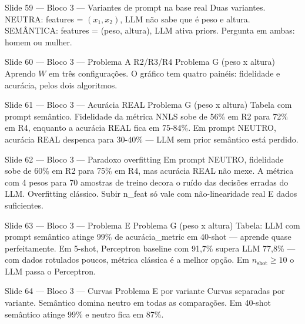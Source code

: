 \documentclass[aspectratio=169,10pt]{beamer}
\begin{document}
\begin{frame}{Slide 59 --- Bloco 3 --- Variantes de prompt na base real}
\footnotesize
Duas variantes. NEUTRA: features = $(x_1, x_2)$, LLM n\~ao sabe que \'e peso e altura. SEM\^ANTICA: features = (peso, altura), LLM ativa priors. Pergunta em ambas: homem ou mulher.
\end{frame}

\begin{frame}{Slide 60 --- Bloco 3 --- Problema A R2/R3/R4 Problema G (peso x altura)}
\footnotesize
Aprendo $W$ em tr\^es configura\c{c}\~oes. O gr\'afico tem quatro pain\'eis: fidelidade e acur\'acia, pelos dois algoritmos.
\end{frame}

\begin{frame}{Slide 61 --- Bloco 3 --- Acur\'acia REAL Problema G (peso x altura)}
\footnotesize
Tabela com prompt sem\^antico. Fidelidade da m\'etrica NNLS sobe de 56\% em R2 para 72\% em R4, enquanto a acur\'acia REAL fica em 75-84\%. Em prompt NEUTRO, acur\'acia REAL despenca para 30-40\% --- LLM sem prior sem\^antico est\'a perdido.
\end{frame}

\begin{frame}{Slide 62 --- Bloco 3 --- Paradoxo overfitting}
\footnotesize
Em prompt NEUTRO, fidelidade sobe de 60\% em R2 para 75\% em R4, mas acur\'acia REAL n\~ao mexe. A m\'etrica com 4 pesos para 70 amostras de treino decora o ru\'ido das decis\~oes erradas do LLM. Overfitting cl\'assico. Subir n\_feat s\'o vale com n\~ao-linearidade real E dados suficientes.
\end{frame}

\begin{frame}{Slide 63 --- Bloco 3 --- Problema E Problema G (peso x altura)}
\footnotesize
Tabela: LLM com prompt sem\^antico atinge 99\% de acur\'acia\_metric em 40-shot --- aprende quase perfeitamente. Em 5-shot, Perceptron baseline com 91,7\% supera LLM 77,8\% --- com dados rotulados poucos, m\'etrica cl\'assica \'e a melhor op\c{c}\~ao. Em $n_{\text{shot}} \geq 10$ o LLM passa o Perceptron.
\end{frame}

\begin{frame}{Slide 64 --- Bloco 3 --- Curvas Problema E por variante}
\footnotesize
Curvas separadas por variante. Sem\^antico domina neutro em todas as compara\c{c}\~oes. Em 40-shot sem\^antico atinge 99\% e neutro fica em 87\%.
\end{frame}
\end{document}
